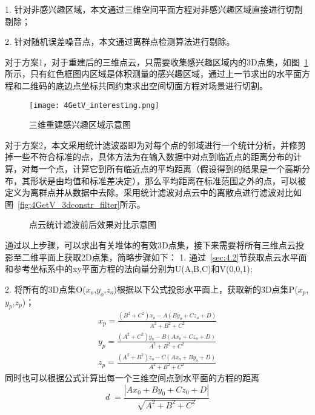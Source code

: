 1. 针对非感兴趣区域，本文通过三维空间平面方程对非感兴趣区域直接进行切割剔除；

2. 针对随机误差噪音点，本文通过离群点检测算法进行剔除。

对于方案1，对于重建后的三维点云，只需要收集感兴趣区域内的3D点集，如图~\ref{fig:4GetV_interesting}所示，只有红色框图内区域是体积测量的感兴趣区域，通过上一节求出的水平面方程和二维码的底边点坐标共同约束求出空间切面方程对场景进行切割。
\begin{figure}[H] %
  \centering
  \texttt{[image: 4GetV\_interesting.png]}
  \caption{三维重建感兴趣区域示意图}
  \label{fig:4GetV_interesting}
\end{figure}
对于方案2，本文采用统计滤波器即为对每个点的邻域进行一个统计分析，并修剪掉一些不符合标准的点，具体方法为在输入数据中对点到临近点的距离分布的计算，对每一个点，计算它到所有临近点的平均距离（假设得到的结果是一个高斯分布，其形状是由均值和标准差决定），那么平均距离在标准范围之外的点，可以被定义为离群点并从数据中去除。采用统计滤波对点云中的离散点进行滤波对比如图~\ref{fig:4GetV_3dconstr_filter}所示。
\begin{figure}[H]
  \centering
  \vskip0.5cm
  \caption{点云统计滤波前后效果对比示意图}\label{fig:4GetV_3dconstr_noise}
\end{figure}
通过以上步骤，可以求出有关堆体的有效3D点集，接下来需要将所有三维点云投影至二维平面上获取2D点集，简略步骤如下：
1. 通过~\ref{sec:4.2}节获取点云水平面和参考坐标系中的xy平面方程的法向量分别为U(A,B,C)和V(0,0,1);

2. 将所有的3D点集O($x_o$,$y_o$,$z_o$)根据以下公式投影水平面上，获取新的3D点集P($x_p$,$y_p$,$z_p$)；
\begin{equation}
  \begin{split}
  x_p=\frac{(B^2+C^2)x_o-A(By_o+Cz_o+D)}{A^2+B^2+C^2}\\
  y_p=\frac{(A^2+C^2)y_o-B(Ax_o+Cz_o+D)}{A^2+B^2+C^2}\\
  z_p=\frac{(A^2+B^2)z_o-C(Ax_o+By_o+D)}{A^2+B^2+C^2}
  \label{equ:pxyz}
  \end{split}
\end{equation}
同时也可以根据公式计算出每一个三维空间点到水平面的方程的距离
\begin{equation}
d\;=\frac{\left|Ax_0+By_0+Cz_0+D\right|}{\sqrt{A^2+B^2+C^2}}
\end{equation}


